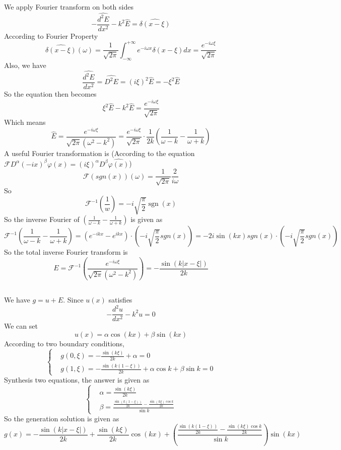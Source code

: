 \documentclass{article}
\begin{document}
\subsection{}
We apply Fourier transform on both sides
\[
	-\widehat{\frac{d^{2} E}{d x^{2}}}-k^{2} \widehat{E}=\widehat{\delta(x-\xi)}
\]
According to Fourier Property
\[
	\widehat{\delta(x-\xi)} (\omega)= \frac{1}{\sqrt{2 \pi}} \int_{-\infty} ^ {+\infty} e^{-i \omega x} \delta(x- \xi) dx = \frac{e^{-i \omega \xi}}{\sqrt{2 \pi}}
\]
Also, we have 
\[
	\widehat{\frac{d^{2} E}{d x^{2}}} = \widehat{D^2 E} = (i \xi)^2 \hat{E} = -\xi^2 \hat E
\]
So the equation then becomes
\[
	\xi^2 \widehat E - k^{2} \widehat{E} = \frac{e^{-i \omega \xi}}{\sqrt{2 \pi}}
\]
Which means
\[
	\widehat{E} = \frac{e^{-i \omega \xi}}{\sqrt{2 \pi} (\omega^2 - k^2)} = \frac{e^{-i \omega \xi}}{\sqrt{2 \pi}} \cdot \frac{1}{2k}(\frac{1}{\omega-k} - \frac{1}{\omega +k}) 
\]
A useful Fourier transformation is (According to the equation $\mathcal{F}D^ \alpha (-ix)^\beta \varphi(x) = (i \xi)^ \alpha D^ \beta \widehat{\varphi(x)} $)
\[
	\mathcal{F}(sgn(x)) (\omega) = \frac{1}{\sqrt{2\pi}} \frac{2}{i \omega}
\]
So
\[
	\mathcal{F}^{-1}\left(\frac{1}{w}\right)=-i \sqrt{\frac{\pi}{2}} \operatorname{sgn}(x)
\]
So the inverse Fourier of $(\frac{1}{\omega-k} - \frac{1}{\omega +k})$ is given as 
\[
	\mathcal{F}^{-1} \left(\frac{1}{\omega-k}- \frac{1}{\omega+k}\right) = (e^{-i k x} - e^{ikx})\cdot (-i \sqrt{\frac{\pi}{2}} sgn(x)) = -2i \sin(kx) sgn(x) \cdot (-i \sqrt{\frac{\pi}{2}} sgn(x))
\]
So the total inverse Fourier transform is 
\[
	E = \mathcal{F}^{-1} (\frac{e^{-i \omega \xi}}{\sqrt{2 \pi}\left(\omega^{2}-k^{2}\right)})= -\frac{\sin (k|x- \xi|)}{2k}
\]
\subsection{}

We have $g = u+E$. Since $u(x)$ satisfies
\[
	-\frac{d^{2} u}{d x^{2}}-k^{2} u=0
\]
We can set 
\[
	u(x) = \alpha \cos(kx) + \beta \sin(kx)
\]
According to two boundary conditions,
\[
\left\{\begin{aligned}
&g(0, \xi)=-\frac{\sin(k \xi)}{2k}+\alpha=0 \\ 
&g(1, \xi)=-\frac{\sin(k (1-\xi))}{2k}+\alpha \cos k+\beta \sin k=0
\end{aligned}
\right.
\]
Synthesis two equations, the answer is given as
\[
	\left\{
	\begin{aligned}
	&\alpha = \frac{\sin(k\xi)}{2k} \\
	&\beta = \frac{\frac{\sin(k(1-\xi))}{2k}-\frac{\sin(k\xi)\cos k}{2k} }{\sin k }
	\end{aligned}
	\right.
\]
So the generation solution is given as 
\[
	g(x) =  -\frac{\sin (k|x- \xi|)}{2k} + \frac{\sin(k\xi)}{2k}\cos(kx)+ \left(\frac{\frac{\sin(k(1-\xi))}{2k}-\frac{\sin(k\xi)\cos k}{2k} }{\sin k }\right)\sin(kx)
\]
\end{document}
